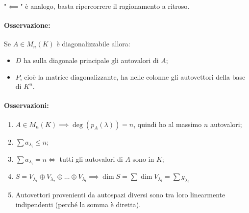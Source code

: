 {"\(\impliedby \)" è analogo, basta ripercorrere il ragionamento a ritroso.}

\paragraph{Osservazione:} Se \(A \in M_n(K)\) è diagonalizzabile allora:
\begin{itemize}
    \item \(D\) ha sulla diagonale principale gli autovalori di \(A\);
    \item \(P\), cioè la matrice diagonalizzante, ha nelle colonne gli autovettori della base di \(K^{n}\).
\end{itemize}



\paragraph{Osservazioni:} 
\begin{enumerate}
    \item \(A \in M_n(K) \implies \deg(p_A(\lambda )) = n\), quindi ho al massimo \(n\) autovalori;
    \item \(\sum a_{\lambda _i}\le n\);
    \item \(\sum a_{\lambda _i}= n \iff\) tutti gli autovalori di \(A\) sono in \(K\);
    \item \(S =V_{\lambda _1} \oplus V_{\lambda _2} \oplus \ldots \oplus V_{\lambda _t} \implies \dim S = \sum \dim V_{\lambda _i} = \sum g_{\lambda _i}\)
    \item Autovettori provenienti da autospazi diversi sono tra loro linearmente indipendenti (perché la somma è diretta).
\end{enumerate}

